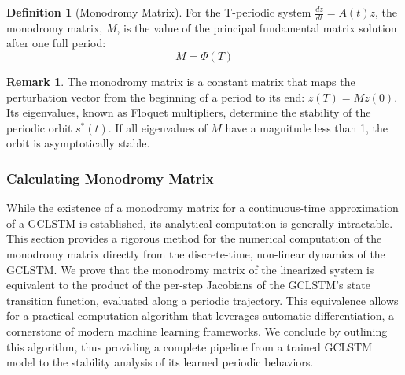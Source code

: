 \documentclass{article}
\theoremstyle{remark}
\theoremstyle{definition}
\newtheorem{definition}{Definition}
\newtheorem{remark}[theorem]{Remark}
\newcommand{\dpt}[1]{\frac{d#1}{dt}} %
\begin{document}
\begin{definition}[Monodromy Matrix]
For the T-periodic system $\dpt{z} = A(t)z$, the monodromy matrix, $M$, is the value of the principal fundamental matrix solution after one full period:
\begin{equation}
    M = \Phi(T)
\end{equation}
\end{definition}

\begin{remark}
The monodromy matrix is a constant matrix that maps the perturbation vector from the beginning of a period to its end: $z(T) = M z(0)$. Its eigenvalues, known as Floquet multipliers, determine the stability of the periodic orbit $s^*(t)$. If all eigenvalues of $M$ have a magnitude less than 1, the orbit is asymptotically stable.
\end{remark}


\subsubsection{Calculating Monodromy Matrix}

While the existence of a monodromy matrix for a continuous-time approximation of a GCLSTM is established, its analytical computation is generally intractable. This section provides a rigorous method for the numerical computation of the monodromy matrix directly from the discrete-time, non-linear dynamics of the GCLSTM. We prove that the monodromy matrix of the linearized system is equivalent to the product of the per-step Jacobians of the GCLSTM's state transition function, evaluated along a periodic trajectory. This equivalence allows for a practical computation algorithm that leverages automatic differentiation, a cornerstone of modern machine learning frameworks. We conclude by outlining this algorithm, thus providing a complete pipeline from a trained GCLSTM model to the stability analysis of its learned periodic behaviors.
\end{document}

